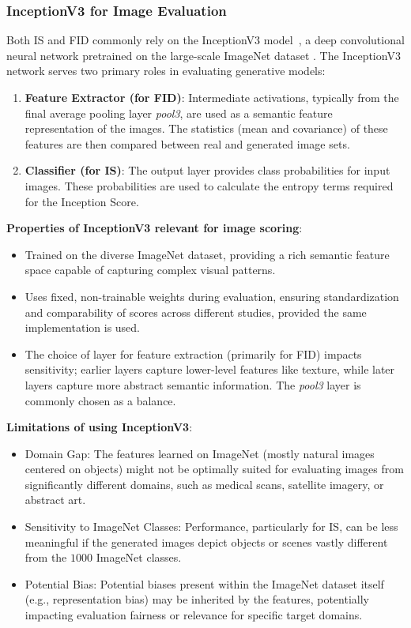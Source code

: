 \subsubsection[InceptionV3 Model]{InceptionV3 for Image Evaluation}

Both IS and FID commonly rely on the InceptionV3 model~\cite{szegedy2016rethinking}, a deep convolutional neural network pretrained on the large-scale ImageNet dataset \cite{ImageNetDataset5206848}. The InceptionV3 network serves two primary roles in evaluating generative models:

\begin{enumerate}
    \item \textbf{Feature Extractor (for FID)}: Intermediate activations, typically from the final average pooling layer \textit{pool3}, are used as a semantic feature representation of the images. The statistics (mean and covariance) of these features are then compared between real and generated image sets.
    \item \textbf{Classifier (for IS)}: The output layer provides class probabilities for input images. These probabilities are used to calculate the entropy terms required for the Inception Score.
\end{enumerate}

\noindent\textbf{Properties of InceptionV3 relevant for image scoring}:
\begin{itemize}
    \item Trained on the diverse ImageNet dataset, providing a rich semantic feature space capable of capturing complex visual patterns.
    \item Uses fixed, non-trainable weights during evaluation, ensuring standardization and comparability of scores across different studies, provided the same implementation is used.
    \item The choice of layer for feature extraction (primarily for FID) impacts sensitivity; earlier layers capture lower-level features like texture, while later layers capture more abstract semantic information. The \textit{pool3} layer is commonly chosen as a balance.
\end{itemize}

\noindent\textbf{Limitations of using InceptionV3}:\label{theoretical_inception_model_limitaitions}
\begin{itemize}
    \item Domain Gap: The features learned on ImageNet (mostly natural images centered on objects) might not be optimally suited for evaluating images from significantly different domains, such as medical scans, satellite imagery, or abstract art.
    \item Sensitivity to ImageNet Classes: Performance, particularly for IS, can be less meaningful if the generated images depict objects or scenes vastly different from the $1 000$ ImageNet classes.
    \item Potential Bias: Potential biases present within the ImageNet dataset itself (e.g., representation bias) may be inherited by the features, potentially impacting evaluation fairness or relevance for specific target domains.
\end{itemize}



\newpage

